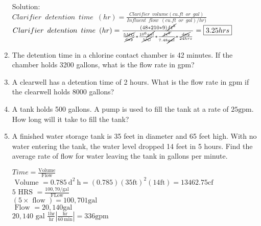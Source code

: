 \documentclass{article}
\begin{document}
\begin{enumerate}
\vspace{0.5cm}



Solution: \\
$Clarifier \enspace detention \enspace time \enspace (hr) = 	\frac{ Clarifier \enspace volume (cu.ft \enspace or \enspace gal)}{Influent \enspace flow \enspace (cu.ft \enspace or \enspace gal)/hr)}$\\
$Clarifier \enspace detention \enspace time \enspace (hr) = 	\frac{(48*210*9)\cancel{ft^3}}{\frac{5\cancel{MG}}{\cancel{day}}*\frac{10^6\cancel{gal}}{\cancel{MG}}*\frac{\cancel{ft^3}}{7.48\cancel{gal}}*\frac{\cancel{day}}{24hrs}}=\boxed{3.25hrs}$\\



\vspace{0.5cm}

\item The detention time in a chlorine contact chamber is 42 minutes. If the chamber holds 3200 gallons, what is the flow rate in gpm?\\

\item A clearwell has a detention time of 2 hours. What is the flow rate in gpm if the
clearwell holds 8000 gallons?\\

  \item A tank holds 500 gallons. A pump is used to fill the tank at a rate of $25 \mathrm{gpm}$. How long will it take to fill the tank?

  \item A finished water storage tank is 35 feet in diameter and 65 feet high. With no water entering the tank, the water level dropped 14 feet in 5 hours. Find the average rate of flow for water leaving the tank in gallons per minute.


$Time=\frac{\text{Volume}}{\text { Flow }}$\\
\vspace{0.3cm}
$\text { Volume } =0.785 \mathrm{~d}^2 \mathrm{~h} =(0.785)(35 \mathrm{ft})^2(14 \mathrm{ft})=13462.75 \mathrm{cf}$ \\
\vspace{0.3cm}
$5 \text { HRS }=\frac{100,70 / \mathrm{gal}}{\text { FLow }}$ \\
\vspace{0.3cm}
$(5 \times \text { flow })=100,701 \mathrm{gal}$ \\
\vspace{0.3cm}
$\text { Flow }=20,140 \mathrm{gal}$ \\
\vspace{0.3cm}
$ 20,140 \text { gal } \frac{1 \mathrm{hr}}{\mathrm{hr}}\left|\frac{\mathrm{hr}}{60 \mathrm{~min}}\right|=336 \mathrm{gpm}$







\end{enumerate}
\end{document}

